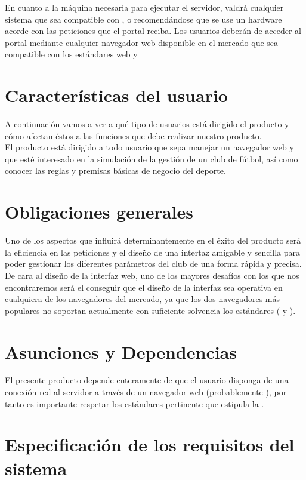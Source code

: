 En cuanto a la máquina necesaria para ejecutar el servidor, valdrá cualquier
sistema que sea compatible con ,  o
 recomendándose que se use un hardware acorde con las
peticiones que el portal reciba. Los usuarios deberán de acceder al portal
mediante cualquier navegador web disponible en el mercado que sea compatible con
los estándares web  y 

\section{Características del usuario}
A continuación vamos a ver a qué tipo de usuarios está dirigido el producto y
cómo afectan éstos a las funciones que debe realizar
nuestro producto.\\

El producto está dirigido a todo usuario que sepa manejar un navegador web y que
esté interesado en la simulación de la gestión de un club de fútbol, así como
conocer las reglas y premisas básicas de negocio del deporte.
\section{Obligaciones generales}
Uno de los aspectos que influirá determinantemente en el éxito del producto será
la eficiencia en las peticiones y el diseño de una intertaz amigable y sencilla
para poder gestionar los diferentes
parámetros del club de una forma rápida y precisa.\\

De cara al diseño de la interfaz web, uno de los mayores desafíos con los que
nos encontraremos será el conseguir que el diseño de la interfaz sea operativa
en cualquiera de los navegadores del mercado, ya que los dos navegadores más
populares no soportan actualmente con suficiente solvencia los estándares
 ( y ).
\section{Asunciones y Dependencias}
El presente producto depende enteramente de que el usuario disponga de una
conexión red al servidor a través de un navegador web (probablemente
), por tanto es importante respetar los
estándares pertinente que estipula la .\\

\section{Especificación de los requisitos del sistema}
